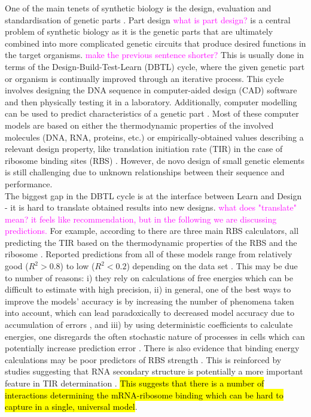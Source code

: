 \documentclass{article}
\newcommand{\mengyan}[1]{\textcolor{magenta}{#1}}
\begin{document}
One of the main tenets of synthetic biology is the design, evaluation and standardisation of genetic parts \cite{Brophy2014,Canton2008,Stanton2014}.
Part design \mengyan{what is part design?} is a central problem of synthetic biology as it is the genetic parts that are ultimately combined into more complicated genetic circuits that produce desired functions in the target organisms. \mengyan{make the previous sentence shorter?}
This is usually done in terms of the Design-Build-Test-Learn (DBTL) cycle, where the given genetic part or organism is continually improved through an iterative process.
This cycle involves designing the DNA sequence in computer-aided design (CAD) software and then physically testing it in a laboratory.
Additionally, computer modelling can be used to predict characteristics of a genetic part \cite{Yeoh2019,Nielsen2016}.
Most of these computer models are based on either the thermodynamic properties of the involved molecules (DNA, RNA, proteins, etc.) or empirically-obtained values describing a relevant design property, like translation initiation rate (TIR) in the case of ribosome binding sites (RBS) \cite{Xia1998,Chen2013,Reeve2014}.
However, de novo design of small genetic elements is still challenging due to unknown relationships between their sequence and performance.
\\

The biggest gap in the DBTL cycle is at the interface between Learn and Design - it is hard to translate obtained results into new designs. \mengyan{what does "translate" mean? it feels like recommendation, but in the following we are discussing predictions.}
For example, according to  \textcite{Reeve2014} there are three main RBS calculators, all predicting the TIR based on the thermodynamic properties of the RBS and the ribosome \cite{Seo2013,Na2010,Salis2009}. 
Reported predictions from all of these models range from relatively good ($R^2 >0.8$) to low ($R^2 <0.2$) depending on the data set \cite{Reis2020}.
This may be due to number of reasons: 
i) they rely on calculations of free energies which can be difficult to estimate with high precision, 
ii) in general, one of the best ways to improve the models' accuracy is by increasing the number of phenomena taken into account, which can lead paradoxically to decreased model accuracy due to accumulation of errors \cite{EspahBorujeni2016}, and 
iii) by using deterministic coefficients to calculate energies, one disregards the often stochastic nature of processes in cells which can potentially increase prediction error \cite{Goss1998}. 
There is also evidence that binding energy calculations may be poor predictors of RBS strength \cite{Saito2020,Sherer1980}. 
This is reinforced by studies suggesting that RNA secondary structure is potentially a more important feature in TIR determination \cite{DESMIT1994,EspahBorujeni2016}.
\hl{This suggests that there is a number of interactions determining the mRNA-ribosome binding which can be hard to capture in a single, universal model}.\\
\end{document}
